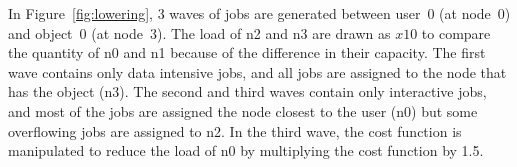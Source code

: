 In Figure~\ref{fig:lowering}, 3 waves of jobs are generated between
user~0 (at node~0) and object~0 (at node~3).
The load of n2 and n3 are drawn as $x10$ to compare the quantity of n0
and n1 because of the difference in their capacity.
The first wave contains only data intensive jobs, and all jobs are
assigned to the node that has the object (n3).
The second and third waves contain only interactive jobs, and most of
the jobs are assigned the node closest to the user (n0) but some
overflowing jobs are assigned to n2.
In the third wave, the cost function is manipulated to reduce the load
of n0 by multiplying the cost function by 1.5.
